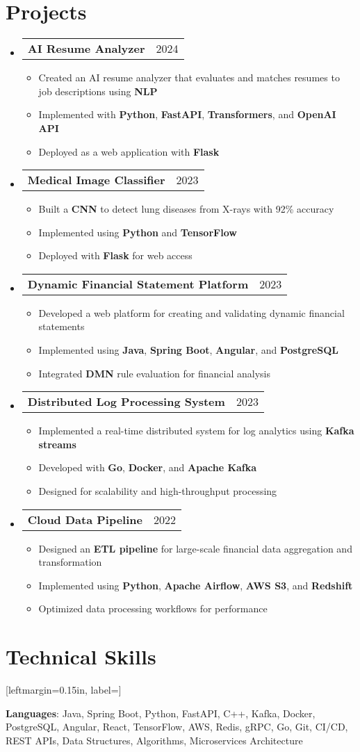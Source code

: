 \documentclass[letterpaper,11pt]{article}
\makeatletter
\newcommand{\resumeItem}[1]{
    \item\small{
            {#1 \vspace{-2pt}}
    }
}
\newcommand{\resumeProjectHeading}[2]{
    \item
    \begin{tabular*}{0.97\textwidth}{l@{\extracolsep{\fill}}r}
    \small#1 & #2 \\
    \end{tabular*}\vspace{-7pt}
}
\newcommand{\resumeSubHeadingListStart}{\begin{itemize}[leftmargin=0.15in, label={}]}
\newcommand{\resumeSubHeadingListEnd}{\end{itemize}}
\newcommand{\resumeItemListStart}{\begin{itemize}}
\newcommand{\resumeItemListEnd}{\end{itemize}\vspace{-5pt}}
\makeatother
\begin{document}
\section{Projects}
\resumeSubHeadingListStart
\resumeProjectHeading
{\textbf{AI Resume Analyzer}}{2024}
\resumeItemListStart
\resumeItem{Created an AI resume analyzer that evaluates and matches resumes to job descriptions using \textbf{NLP}}
\resumeItem{Implemented with \textbf{Python}, \textbf{FastAPI}, \textbf{Transformers}, and \textbf{OpenAI API}}
\resumeItem{Deployed as a web application with \textbf{Flask}}
\resumeItemListEnd
\resumeProjectHeading
{\textbf{Medical Image Classifier}}{2023}
\resumeItemListStart
\resumeItem{Built a \textbf{CNN} to detect lung diseases from X-rays with 92\% accuracy}
\resumeItem{Implemented using \textbf{Python} and \textbf{TensorFlow}}
\resumeItem{Deployed with \textbf{Flask} for web access}
\resumeItemListEnd
\resumeProjectHeading
{\textbf{Dynamic Financial Statement Platform}}{2023}
\resumeItemListStart
\resumeItem{Developed a web platform for creating and validating dynamic financial statements}
\resumeItem{Implemented using \textbf{Java}, \textbf{Spring Boot}, \textbf{Angular}, and \textbf{PostgreSQL}}
\resumeItem{Integrated \textbf{DMN} rule evaluation for financial analysis}
\resumeItemListEnd
\resumeProjectHeading
{\textbf{Distributed Log Processing System}}{2023}
\resumeItemListStart
\resumeItem{Implemented a real-time distributed system for log analytics using \textbf{Kafka streams}}
\resumeItem{Developed with \textbf{Go}, \textbf{Docker}, and \textbf{Apache Kafka}}
\resumeItem{Designed for scalability and high-throughput processing}
\resumeItemListEnd
\resumeProjectHeading
{\textbf{Cloud Data Pipeline}}{2022}
\resumeItemListStart
\resumeItem{Designed an \textbf{ETL pipeline} for large-scale financial data aggregation and transformation}
\resumeItem{Implemented using \textbf{Python}, \textbf{Apache Airflow}, \textbf{AWS S3}, and \textbf{Redshift}}
\resumeItem{Optimized data processing workflows for performance}
\resumeItemListEnd
\resumeSubHeadingListEnd

\section{Technical Skills}
\begin{itemize}[leftmargin=0.15in, label={]}
\small{\item{
\textbf{Languages}{: Java, Spring Boot, Python, FastAPI, C++, Kafka, Docker, PostgreSQL, Angular, React, TensorFlow, AWS, Redis, gRPC, Go, Git, CI/CD, REST APIs, Data Structures, Algorithms, Microservices Architecture} \\
}}
\end{itemize}
\end{document}
